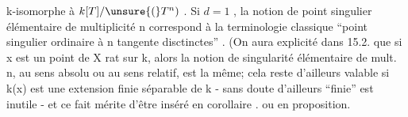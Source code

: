 
k-isomorphe à $k[T]/\unsure{(}T^n)$ . Si $d=1$ , la notion de point singulier
 élémentaire de multiplicité n correspond à la terminologie
classique ``point singulier ordinaire à n tangente disctinctes'' .
(On aura  explicité dans 15.2. que si x est un point de X rat sur k, alors
la notion de singularité élémentaire de mult. n, au sens absolu ou au
sens relatif,  est la même; cela reste d'ailleurs valable si k(x)
est une extension finie séparable de k - sans doute d'ailleurs ``finie''
est inutile - et ce fait mérite d'être inséré en corollaire .
ou en proposition\hand{)}.

